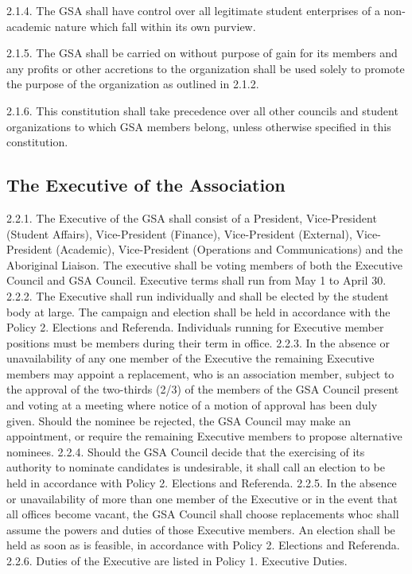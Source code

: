2.1.4. The GSA shall have control over all legitimate student enterprises of a non-academic nature which fall within its own purview. 

2.1.5. The GSA shall be carried on without purpose of gain for its members 
and any profits or other accretions to the organization shall be used 
solely to promote the purpose of the organization as outlined in 2.1.2. 

2.1.6. This constitution shall take precedence over all other councils and 
student organizations to which GSA members belong, unless otherwise 
specified in this constitution. 
\subsection{The Executive of the Association }
2.2.1. The Executive of the GSA shall consist of a President, Vice-President (Student Affairs), Vice-President (Finance), Vice-President (External), 
Vice-President (Academic), Vice-President (Operations and Communications) and the Aboriginal Liaison. The executive shall be voting members of both the Executive Council and GSA Council. Executive terms shall run from May 1 to April 30. 
2.2.2. The Executive shall run individually and shall be elected by the student body at large. The campaign and election shall be held in accordance with the Policy 2. Elections and Referenda. Individuals running for Executive member positions must be members during their term in office. 
2.2.3. In the absence or unavailability of any one member of the Executive the remaining Executive members may appoint a replacement, who is an association member, subject to the approval of the two-thirds (2/3) of the members of the GSA Council present and voting at a meeting where notice of a motion of approval has been duly given. Should the nominee be rejected, the GSA Council may make an appointment, or require the remaining Executive members to propose alternative nominees. 
2.2.4. Should the GSA Council decide that the exercising of its authority to nominate candidates is undesirable, it shall call an election to be held in accordance with Policy 2. Elections and Referenda. 
2.2.5. In the absence or unavailability of more than one member of the 
Executive or in the event that all offices become vacant, the GSA 
Council shall choose replacements whoc shall assume the powers and 
duties of those Executive members. An election shall be held as soon 
as is feasible, in accordance with Policy 2. Elections and Referenda. 
2.2.6. Duties of the Executive are listed in Policy 1. Executive Duties. 

